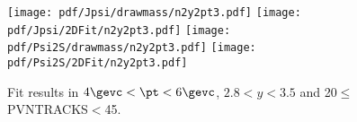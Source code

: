 \begin{figure}[H]
\begin{center}
\texttt{[image: pdf/Jpsi/drawmass/n2y2pt3.pdf]}
\texttt{[image: pdf/Jpsi/2DFit/n2y2pt3.pdf]}
\vspace*{-0.5cm}
\texttt{[image: pdf/Psi2S/drawmass/n2y2pt3.pdf]}
\texttt{[image: pdf/Psi2S/2DFit/n2y2pt3.pdf]}
\vspace*{-0.5cm}
\end{center}
\caption{Fit results in $4\gevc<\pt<6\gevc$, $2.8<y<3.5$ and 20$\leq$PVNTRACKS$<$45.}
\label{Fitn2y2pt3}
\end{figure}
